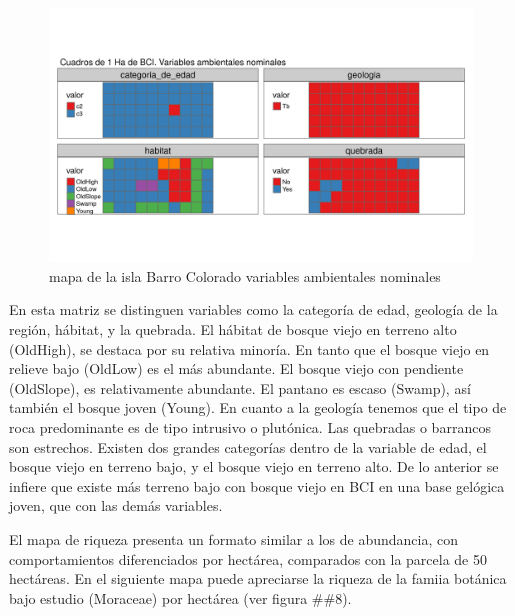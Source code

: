 \documentclass[11pt,]{article}
\begin{document}
\begin{figure}
\centering
\includegraphics[width=1.00000\textwidth]{mapas_variables_ambientales_nominales_tmap.png}
\caption{mapa de la isla Barro Colorado variables ambientales nominales
\label{fig:bci_map}}
\end{figure}

En esta matriz se distinguen variables como la categoría de edad,
geología de la región, hábitat, y la quebrada. El hábitat de bosque
viejo en terreno alto (OldHigh), se destaca por su relativa minoría. En
tanto que el bosque viejo en relieve bajo (OldLow) es el más abundante.
El bosque viejo con pendiente (OldSlope), es relativamente abundante. El
pantano es escaso (Swamp), así también el bosque joven (Young). En
cuanto a la geología tenemos que el tipo de roca predominante es de tipo
intrusivo o plutónica. Las quebradas o barrancos son estrechos. Existen
dos grandes categorías dentro de la variable de edad, el bosque viejo en
terreno bajo, y el bosque viejo en terreno alto. De lo anterior se
infiere que existe más terreno bajo con bosque viejo en BCI en una base
gelógica joven, que con las demás variables.

El mapa de riqueza presenta un formato similar a los de abundancia, con
comportamientos diferenciados por hectárea, comparados con la parcela de
50 hectáreas. En el siguiente mapa puede apreciarse la riqueza de la
famiia botánica bajo estudio (Moraceae) por hectárea (ver figura \#\#8).
\end{document}
